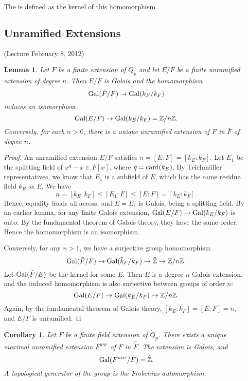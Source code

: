 \documentclass{amsart}
\newtheorem{lemma}[equation]{Lemma}
\newtheorem{corollary}[equation]{Corollary}
\def\oG{\op{Gal}}
\begin{document}
The  is defined as the kernel of this homomorphism.


\subsection{Unramified Extensions}


(Lecture February 8, 2012)


\begin{lemma}
  Let $F$ be a finite extension of $\ring{Q}_p$ and let $E/F$ be a
  finite unramified extension of degree $n$. Then $E/F$ is Galois and
  the homomorphism
\[
\oG(\bar{{F}}/F)\to\oG(\bar{k_F}/k_F)
\]
induces an isomorphism
\[
\oG(E/F) \to \oG(k_E/k_F) = \ring{Z}/n\ring{Z}.
\]
Conversely, for each $n>0$, there is a unique unramified extension of $F$ in $\bar F$
of degree $n$.
\end{lemma}

\begin{proof} An unramified extension $E/F$ satisfies $n=[E:F]=[k_E:k_F]$.
Let $E_1$ be the splitting field of $x^q - x \in F[x]$, where $q = {\operatorname{card}}(k_E)$.
By Teichm\"uller representatives, we know that $E_1$ is a subfield of $E$, which
has the same residue field $k_E$ as $E$.  We have
\[
n = [k_E:k_F] \le [E_1:F] \le [E:F] = [k_E:k_F].
\]
Hence, equality holds all across, and $E=E_1$ is Galois, being a splitting field.
By an earlier lemma, for any finite Galois extension, $\oG(E/F)\to\oG(k_E/k_F)$
is onto.  By the fundamental theorem of Galois theory, they have the same order.
Hence the homomorphism is an isomorphism.

Conversely, for any $n>1$, we have a surjective group homomorphism
\[
\oG(\bar{F}/F)\to \oG(\bar{k}_F/k_F) \to\hat{\ring{Z}}\to \ring{Z}/n\ring{Z}.
\]
Let $\oG(\bar{F}/E)$ be the kernel for some $E$.  Then $E$ is a degree $n$
Galois extension, and the induced homomorphism is also surjective between groups
of order $n$:
\[
\oG(E/F) \to \oG(k_E/k_F)\to \ring{Z}/n\ring{Z}.
\]
Again, by the fundamental theorem of Galois theory, $[k_E:k_F]=[E:F]=n$,
and $E/F$ is unramified.
\end{proof}

\begin{corollary} Let $F$ be a finite field extension of $\ring{Q}_p$.
  There exists a unique maximal unramified extension $F^{unr}$ of $F$
  in $\bar{\ring{F}}$.  The extension is Galois, and
\[
\oG(F^{unr}/F) = \hat{\ring{Z}}.
\]
A topological generator of the group is the Frobenius automorphism.
\end{corollary}
\end{document}
